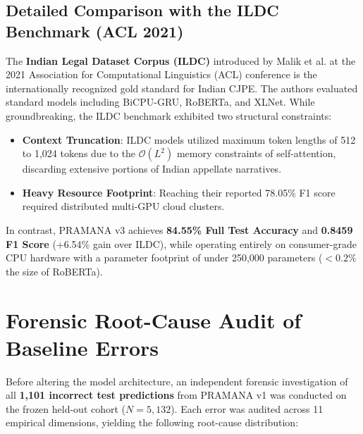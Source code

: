 \documentclass[journal,10pt,twocolumn]{IEEEtran}
\begin{document}
\subsection{Detailed Comparison with the ILDC Benchmark (ACL 2021)}
The \textbf{Indian Legal Dataset Corpus (ILDC)} introduced by Malik et al. at the 2021 Association for Computational Linguistics (ACL) conference is the internationally recognized gold standard for Indian CJPE. The authors evaluated standard models including BiCPU-GRU, RoBERTa, and XLNet. While groundbreaking, the ILDC benchmark exhibited two structural constraints:
\begin{itemize}
    \item \textbf{Context Truncation}: ILDC models utilized maximum token lengths of 512 to 1,024 tokens due to the $\mathcal{O}(L^2)$ memory constraints of self-attention, discarding extensive portions of Indian appellate narratives.
    \item \textbf{Heavy Resource Footprint}: Reaching their reported 78.05\% F1 score required distributed multi-GPU cloud clusters.
\end{itemize}

In contrast, PRAMANA v3 achieves \textbf{84.55\% Full Test Accuracy} and \textbf{0.8459 F1 Score} (+6.54\% gain over ILDC), while operating entirely on consumer-grade CPU hardware with a parameter footprint of under 250,000 parameters ($< 0.2\%$ the size of RoBERTa).

\section{Forensic Root-Cause Audit of Baseline Errors}
Before altering the model architecture, an independent forensic investigation of all \textbf{1,101 incorrect test predictions} from PRAMANA v1 was conducted on the frozen held-out cohort ($N = 5,132$). Each error was audited across 11 empirical dimensions, yielding the following root-cause distribution:
\end{document}
